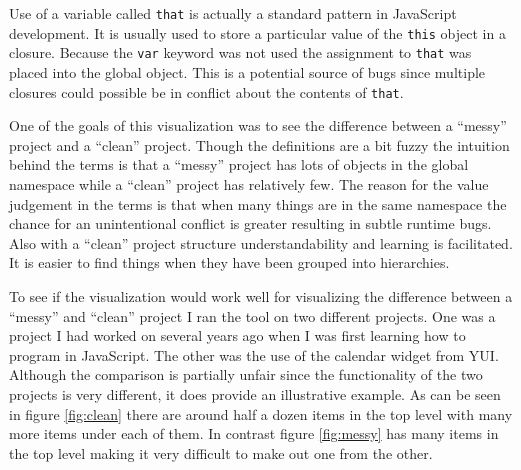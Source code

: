 \documentclass[]{article}
\begin{document}
Use of a variable called {\tt that} is actually a standard pattern in JavaScript development. It is usually used to store a particular value of the {\tt this} object in a closure. Because the {\tt var} keyword was not used the assignment to {\tt that} was placed into the global object. This is a potential source of bugs since multiple closures could possible be in conflict about the contents of {\tt that}.


One of the goals of this visualization was to see the difference between a ``messy'' project and a ``clean'' project. Though the definitions are a bit fuzzy the intuition behind the terms is that a ``messy'' project has lots of objects in the global namespace while a ``clean'' project has relatively few. The reason for the value judgement in the terms is that when many things are in the same namespace the chance for an unintentional conflict is greater resulting in subtle runtime bugs. Also with a ``clean'' project structure understandability and learning is facilitated. It is easier to find things when they have been grouped into hierarchies.


To see if the visualization would work well for visualizing the difference between a ``messy'' and ``clean'' project I ran the tool on two different projects. One was a project I had worked on several years ago when I was first learning how to program in JavaScript. The other was the use of the calendar widget from YUI. Although the comparison is partially unfair since the functionality of the two projects is very different, it does provide an illustrative example. As can be seen in figure \ref{fig:clean} there are around half a dozen items in the top level with many more items under each of them. In contrast figure \ref{fig:messy} has many items in the top level making it very difficult to make out one from the other.



\end{document}
